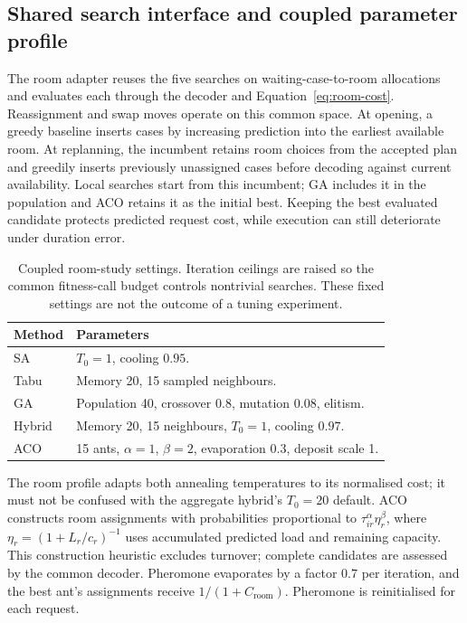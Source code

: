 \subsection{Shared search interface and coupled parameter profile}
\label{sec:room-approach}

The room adapter reuses the five searches on waiting-case-to-room allocations
and evaluates each through the decoder and Equation~\ref{eq:room-cost}.
Reassignment and swap moves operate on this common space. At opening, a
greedy baseline inserts cases by increasing prediction into the earliest
available room. At replanning, the incumbent retains room choices from the
accepted plan and greedily inserts previously unassigned cases before decoding
against current availability. Local searches start from this incumbent;
GA includes it in the population and ACO retains it as the initial best.
Keeping the best evaluated candidate protects predicted request cost, while
execution can still deteriorate under duration error.

\begin{table}[htbp]
\centering\small
\caption{Coupled room-study settings. Iteration ceilings are raised so the
common fitness-call budget controls nontrivial searches. These fixed settings
are not the outcome of a tuning experiment.}
\label{tab:room-settings}
\begin{tabularx}{\linewidth}{@{}lY@{}}
\toprule
Method & Parameters \\
\midrule
SA & $T_0=1$, cooling $0.95$. \\
Tabu & Memory 20, 15 sampled neighbours. \\
GA & Population 40, crossover $0.8$, mutation $0.08$, elitism. \\
Hybrid & Memory 20, 15 neighbours, $T_0=1$, cooling $0.97$. \\
ACO & 15 ants, $\alpha=1$, $\beta=2$, evaporation $0.3$, deposit scale 1. \\
\bottomrule
\end{tabularx}
\end{table}

The room profile adapts both annealing temperatures to its normalised cost;
it must not be confused with the aggregate hybrid's $T_0=20$ default. ACO
constructs room assignments with probabilities proportional to
$\tau_{ir}^{\alpha}\eta_r^{\beta}$, where
$\eta_r=(1+L_r/c_r)^{-1}$ uses accumulated predicted load and remaining
capacity. This construction heuristic excludes turnover; complete candidates
are assessed by the common decoder. Pheromone evaporates by a factor $0.7$
per iteration, and the best ant's assignments receive $1/(1+C_{\mathrm{room}})$.
Pheromone is reinitialised for each request.

